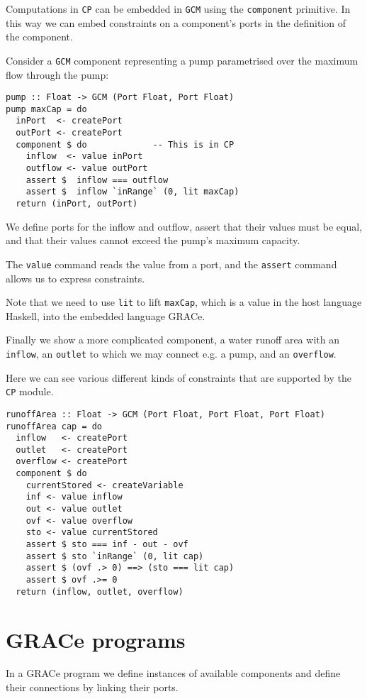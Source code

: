\documentclass[a4paper]{article}
\begin{document}
Computations in \texttt{CP} can be embedded in \texttt{GCM} using the
\texttt{component} primitive. In this way we can embed constraints on a
component's ports in the definition of the component.

Consider a \texttt{GCM} component representing a pump
parametrised over the maximum flow through the pump:
%
\begin{verbatim}
pump :: Float -> GCM (Port Float, Port Float)
pump maxCap = do
  inPort  <- createPort
  outPort <- createPort
  component $ do             -- This is in CP
    inflow  <- value inPort
    outflow <- value outPort
    assert $  inflow === outflow
    assert $  inflow `inRange` (0, lit maxCap)
  return (inPort, outPort)
\end{verbatim}
We define ports for the inflow and outflow, assert that their values must
be equal, and that their values cannot exceed the pump's maximum capacity.

The \texttt{value} command reads the value from a port,
and the \texttt{assert} command allows us to express constraints.

Note that we need to use \texttt{lit} to lift \texttt{maxCap}, which
is a value in the host language Haskell, into the embedded language
GRACe.

Finally we show a more complicated component, a water runoff area with
an \texttt{inflow}, an \texttt{outlet} to which we may connect e.g. a pump,
and an \texttt{overflow}.

Here we can see various different kinds of constraints
that are supported by the \texttt{CP} module.
\begin{verbatim}
runoffArea :: Float -> GCM (Port Float, Port Float, Port Float)
runoffArea cap = do
  inflow   <- createPort
  outlet   <- createPort
  overflow <- createPort
  component $ do
    currentStored <- createVariable
    inf <- value inflow
    out <- value outlet
    ovf <- value overflow
    sto <- value currentStored
    assert $ sto === inf - out - ovf
    assert $ sto `inRange` (0, lit cap)
    assert $ (ovf .> 0) ==> (sto === lit cap)
    assert $ ovf .>= 0
  return (inflow, outlet, overflow)
\end{verbatim}

\section{GRACe programs}
In a GRACe program we define instances of available components and
define their connections by linking their ports.
\end{document}
